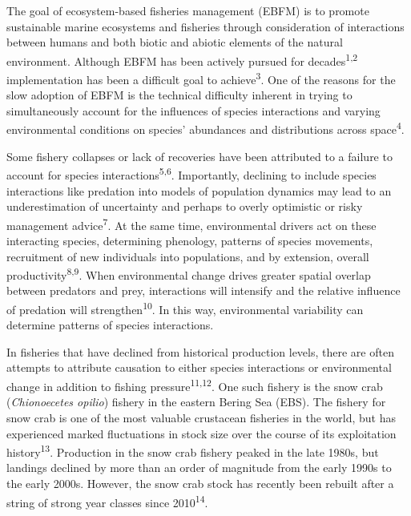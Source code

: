 \documentclass[11pt,]{article}
\begin{document}
The goal of ecosystem-based fisheries management (EBFM) is to promote sustainable marine ecosystems and fisheries through consideration of interactions between humans and both biotic and abiotic elements of the natural environment. Although EBFM has been actively pursued for decades\textsuperscript{1,2} implementation has been a difficult goal to achieve\textsuperscript{3}. One of the reasons for the slow adoption of EBFM is the technical difficulty inherent in trying to simultaneously account for the influences of species interactions and varying environmental conditions on species' abundances and distributions across space\textsuperscript{4}.

Some fishery collapses or lack of recoveries have been attributed to a failure to account for species interactions\textsuperscript{5,6}. Importantly, declining to include species interactions like predation into models of population dynamics may lead to an underestimation of uncertainty and perhaps to overly optimistic or risky management advice\textsuperscript{7}. At the same time, environmental drivers act on these interacting species, determining phenology, patterns of species movements, recruitment of new individuals into populations, and by extension, overall productivity\textsuperscript{8,9}. When environmental change drives greater spatial overlap between predators and prey, interactions will intensify and the relative influence of predation will strengthen\textsuperscript{10}. In this way, environmental variability can determine patterns of species interactions.

In fisheries that have declined from historical production levels, there are often attempts to attribute causation to either species interactions or environmental change in addition to fishing pressure\textsuperscript{11,12}. One such fishery is the snow crab (\emph{Chionoecetes opilio}) fishery in the eastern Bering Sea (EBS). The fishery for snow crab is one of the most valuable crustacean fisheries in the world, but has experienced marked fluctuations in stock size over the course of its exploitation history\textsuperscript{13}. Production in the snow crab fishery peaked in the late 1980s, but landings declined by more than an order of magnitude from the early 1990s to the early 2000s. However, the snow crab stock has recently been rebuilt after a string of strong year classes since 2010\textsuperscript{14}.
\end{document}

